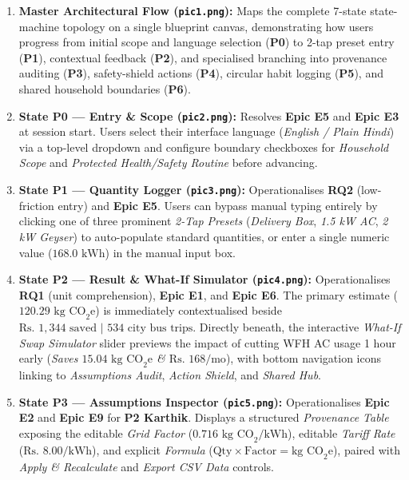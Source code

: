 \documentclass[12pt, a4paper]{article}
\begin{document}
\begin{enumerate}[leftmargin=1.8em, itemsep=0.3em]
    \item \textbf{Master Architectural Flow (\texttt{pic1.png}):} Maps the complete 7-state state-machine topology on a single blueprint canvas, demonstrating how users progress from initial scope and language selection (\textbf{P0}) to 2-tap preset entry (\textbf{P1}), contextual feedback (\textbf{P2}), and specialised branching into provenance auditing (\textbf{P3}), safety-shield actions (\textbf{P4}), circular habit logging (\textbf{P5}), and shared household boundaries (\textbf{P6}).
    \item \textbf{State P0 --- Entry \& Scope (\texttt{pic2.png}):} Resolves \textbf{Epic E5} and \textbf{Epic E3} at session start. Users select their interface language (\textit{English / Plain Hindi}) via a top-level dropdown and configure boundary checkboxes for \textit{Household Scope} and \textit{Protected Health/Safety Routine} before advancing.
    \item \textbf{State P1 --- Quantity Logger (\texttt{pic3.png}):} Operationalises \textbf{RQ2} (low-friction entry) and \textbf{Epic E5}. Users can bypass manual typing entirely by clicking one of three prominent \textit{2-Tap Presets} (\textit{Delivery Box}, \textit{1.5 kW AC}, \textit{2 kW Geyser}) to auto-populate standard quantities, or enter a single numeric value ($168.0\text{ kWh}$) in the manual input box.
    \item \textbf{State P2 --- Result \& What-If Simulator (\texttt{pic4.png}):} Operationalises \textbf{RQ1} (unit comprehension), \textbf{Epic E1}, and \textbf{Epic E6}. The primary estimate ($120.29\text{ kg CO}_2\text{e}$) is immediately contextualised beside $\text{Rs. }1,344\text{ saved | }534\text{ city bus trips}$. Directly beneath, the interactive \textit{What-If Swap Simulator} slider previews the impact of cutting WFH AC usage 1 hour early (\textit{Saves $15.04\text{ kg CO}_2\text{e}$ \& $\text{Rs. }168\text{/mo}$}), with bottom navigation icons linking to \textit{Assumptions Audit}, \textit{Action Shield}, and \textit{Shared Hub}.
    \item \textbf{State P3 --- Assumptions Inspector (\texttt{pic5.png}):} Operationalises \textbf{Epic E2} and \textbf{Epic E9} for \textbf{P2 Karthik}. Displays a structured \textit{Provenance Table} exposing the editable \textit{Grid Factor} ($0.716\text{ kg CO}_2\text{/kWh}$), editable \textit{Tariff Rate} ($\text{Rs. }8.00\text{/kWh}$), and explicit \textit{Formula} ($\text{Qty} \times \text{Factor} = \text{kg CO}_2\text{e}$), paired with \textit{Apply \& Recalculate} and \textit{Export CSV Data} controls.

\end{enumerate}
\end{document}
